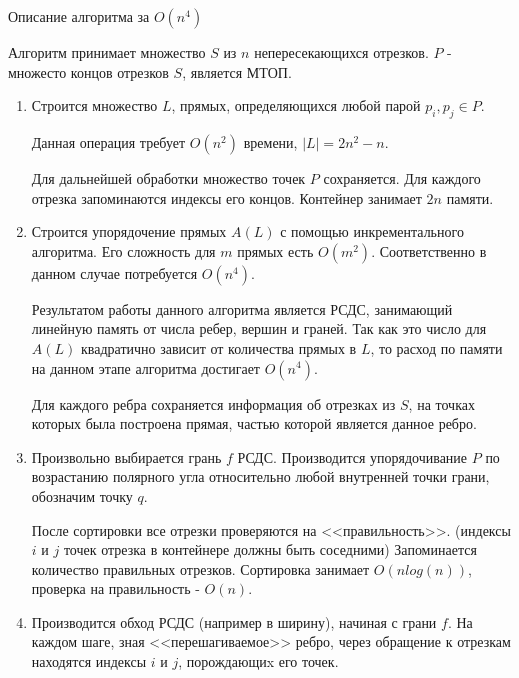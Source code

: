 \documentclass[letterpaper,12pt]{article}
\begin{document}
\begin{center}
Описание алгоритма за $O(n^4)$
\end{center}
\par
Алгоритм принимает множество $S$ из $n$ непересекающихся отрезков.
$P$ - множесто концов отрезков $S$, является МТОП.
\begin{enumerate}
      \item Строится множество $L$, прямых, определяющихся любой парой 
            $p_i, p_j \in P$.
            \par
            Данная операция требует $O(n^2)$ времени, $|L| = 2n^2-n$.
            \par
            Для дальнейшей обработки множество точек $P$ сохраняется.
            Для каждого отрезка запоминаются индексы его концов.
            Контейнер занимает $2n$ памяти.
      \item Строится упорядочение прямых $A(L)$ с помощью 
            инкрементального алгоритма. Его сложность для $m$ прямых есть 
            \hyperlink{literature_1}{$O(m^2)$}. Соответственно в данном 
            случае потребуется $O(n^4)$.
            \par
            Результатом работы данного алгоритма является РСДС,
            занимающий линейную память от числа ребер, вершин и граней.
            Так как это число для $A(L)$ квадратично зависит от количества
            прямых в $L$, то расход по памяти на данном этапе алгоритма 
            достигает $O(n^4)$.
            \par
            Для каждого ребра сохраняется информация об отрезках из $S$,
            на точках которых была построена прямая, частью которой 
            является данное ребро.
      \item Произвольно выбирается грань $f$ РСДС. Производится 
            упорядочивание $P$ по возрастанию полярного угла относительно 
            любой внутренней точки грани, обозначим точку $q$.
            \par
            После сортировки все отрезки проверяются на <<правильность>>.
            (индексы $i$ и $j$ точек отрезка в контейнере должны быть соседними)
            Запоминается количество правильных отрезков. Сортировка занимает 
            $O(nlog(n))$, проверка на правильность - $O(n)$.
      \item Производится обход РСДС (например в ширину), начиная с грани $f$. 
            На каждом шаге, зная <<перешагиваемое>> ребро, через обращение к 
            отрезкам находятся индексы $i$ и $j$, порождающиx его точек. 

\end{enumerate}
\end{document}
